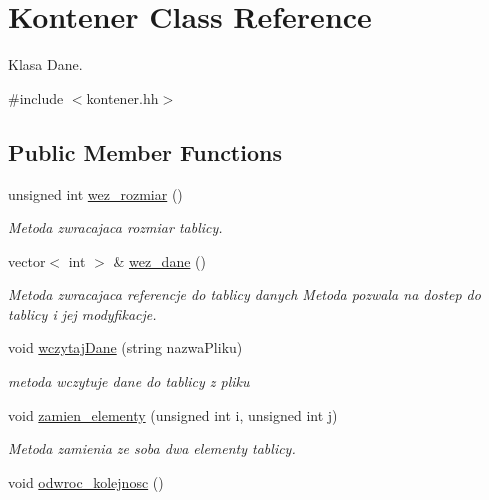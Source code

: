 \hypertarget{class_kontener}{\section{Kontener Class Reference}
\label{class_kontener}
}


Klasa Dane.  




{\ttfamily \#include $<$kontener.\-hh$>$}

\subsection*{Public Member Functions}
\begin{DoxyCompactItemize}
\item 
unsigned int \hyperlink{class_kontener_ab352bcc2f9a14a7981013edcdb785fb2}{wez\-\_\-rozmiar} ()
\begin{DoxyCompactList}\small\item\em Metoda zwracajaca rozmiar tablicy. \end{DoxyCompactList}\item 
vector$<$ int $>$ \& \hyperlink{class_kontener_a86934ff33cb308fe7186396e786f8ba0}{wez\-\_\-dane} ()
\begin{DoxyCompactList}\small\item\em Metoda zwracajaca referencje do tablicy danych Metoda pozwala na dostep do tablicy i jej modyfikacje. \end{DoxyCompactList}\item 
void \hyperlink{class_kontener_a97f02ad6805f5d211d7bec74ce7de0cd}{wczytaj\-Dane} (string nazwa\-Pliku)
\begin{DoxyCompactList}\small\item\em metoda wczytuje dane do tablicy z pliku \end{DoxyCompactList}\item 
void \hyperlink{class_kontener_a8fb07326caee494038c084090a92142a}{zamien\-\_\-elementy} (unsigned int i, unsigned int j)
\begin{DoxyCompactList}\small\item\em Metoda zamienia ze soba dwa elementy tablicy. \end{DoxyCompactList}\item 
\hypertarget{class_kontener_abdbbc48d9251e4b9b670f5498b5da6dc}{void \hyperlink{class_kontener_abdbbc48d9251e4b9b670f5498b5da6dc}{odwroc\-\_\-kolejnosc} ()}\label{class_kontener_abdbbc48d9251e4b9b670f5498b5da6dc}


\end{DoxyCompactItemize}
